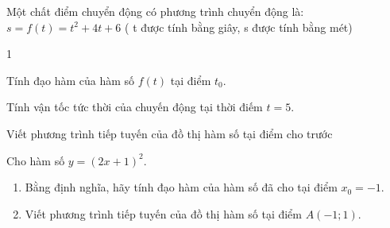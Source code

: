 \begin{vd}
Một chất điểm chuyển động có phương trình chuyển động là: $s=f(t)=t^2+4 t+6$ ( t được tính bằng giây, s được tính bằng mét)
\begin{enumEX}[a)]{1}
	\item Tính đạo hàm của hàm số $f(t)$ tại điểm $t_0$.
	\item Tính vận tốc tức thời của chuyến động tại thời điếm $t=5$.
\end{enumEX}
\end{vd}

\begin{dang}{Viết phương trình tiếp tuyến của đồ thị hàm số tại điểm cho trước}
\end{dang}


\begin{vd}%
	Cho hàm số $y=(2 x+1)^2$.
	\begin{enumerate}
		\item  Bằng định nghĩa, hãy tính đạo hàm của hàm số đã cho tại điểm $x_0=-1$.
		\item  Viết phương trình tiếp tuyến của đồ thị hàm số tại điểm $A(-1 ; 1)$.
	\end{enumerate}
	
\end{vd}%

